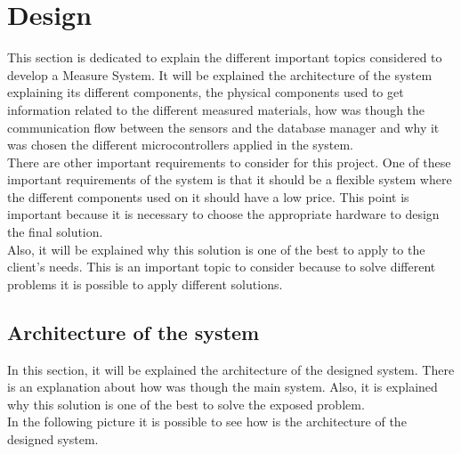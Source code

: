 
\chapter{Design}

This section is dedicated to explain the different important topics considered to develop a Measure System. It will be explained the architecture of the system explaining its different components, the physical components used to get information related to the different measured materials, how was though the communication flow between the sensors and the database manager and why it was chosen the different microcontrollers applied in the system.\\

There are other important requirements to consider for this project. One of these important requirements of the system is that it should be a flexible system where the different components used on it should have a low price. This point is important because it is necessary to choose the appropriate hardware to design the final solution.\\

Also, it will be explained why this solution is one of the best to apply to the client's needs. This is an important topic to consider because to solve different problems it is possible to apply different solutions.

\section{Architecture of the system}

In this section, it will be explained the architecture of the designed system. There is an explanation about how was though the main system. Also, it is explained why this solution is one of the best to solve the exposed problem.\\

In the following picture it is possible to see how is the architecture of the designed system.\\

